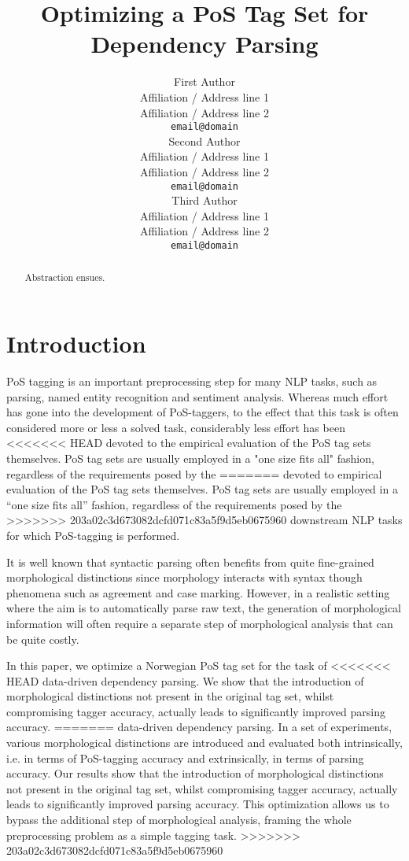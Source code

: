 \documentclass[11pt,a4paper]{article}
\title{Optimizing a PoS Tag Set for Dependency Parsing}
\author{First Author \\
  Affiliation / Address line 1 \\
  Affiliation / Address line 2 \\
  {\tt email@domain} \\\And
  Second Author \\
  Affiliation / Address line 1 \\
  Affiliation / Address line 2 \\
  {\tt email@domain}  \\\And
  Third Author \\
  Affiliation / Address line 1 \\
  Affiliation / Address line 2 \\
  {\tt email@domain} \\}
\date{}
\begin{document}
\maketitle
\begin{abstract}
Abstraction ensues.
\end{abstract}


\section{Introduction}
\label{sec:intro}
PoS tagging is an important preprocessing step for many NLP
tasks, such as parsing, named entity recognition and sentiment
analysis. Whereas much effort has gone into the development of
PoS-taggers, to the effect that this task is often considered
more or less a solved task, considerably less effort has been
<<<<<<< HEAD
devoted to the empirical evaluation of the PoS tag sets
themselves.
PoS tag sets are usually employed in a "one size fits
all" fashion, regardless of the requirements posed by the
=======
devoted to empirical evaluation of the PoS tag sets
themselves. 
PoS tag sets are usually employed in a ``one size fits
all'' fashion, regardless of the requirements posed by the
>>>>>>> 203a02c3d673082dcfd071c83a5f9d5eb0675960
downstream NLP tasks for which PoS-tagging is performed.

It is well known that syntactic parsing often benefits from quite
fine-grained morphological distinctions since morphology interacts
with syntax though phenomena such as agreement and case
marking. However, in a realistic setting where the aim is to
automatically parse raw text, the generation of morphological
information will often require a separate step of morphological
analysis that can be quite costly.

In this paper, we optimize a Norwegian PoS tag set for the task of
<<<<<<< HEAD
data-driven dependency parsing.  We show that the introduction of
morphological distinctions not present in the original tag set, whilst
compromising tagger accuracy, actually leads to significantly improved
parsing accuracy.
=======
data-driven dependency parsing. In a set of experiments, various
morphological distinctions are introduced and evaluated both
intrinsically, i.e. in terms of PoS-tagging accuracy and
extrinsically, in terms of parsing accuracy.  Our results show that
the introduction of morphological distinctions not present in the
original tag set, whilst compromising tagger accuracy, actually leads
to significantly improved parsing accuracy. This optimization allows
us to bypass the additional step of morphological analysis, framing
the whole preprocessing problem as a simple tagging task.
>>>>>>> 203a02c3d673082dcfd071c83a5f9d5eb0675960
\end{document}
